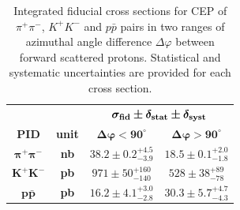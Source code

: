 {
\renewcommand{\arraystretch}{1.5}
\begin{table}[]\centering
\begin{tabular}{cc c c}
~ & ~ & \multicolumn{2}{c}{$\bm{ \sigma_{\text{\bf{fid}}} \pm \delta_{\text{\bf{stat}}} \pm \delta_{\text{\bf{syst}}}}$} \\
 \bf{PID} & \bf{unit} & $\bm{\Delta\varphi<90^{\circ}}$ & $\bm{\Delta\varphi>90^{\circ}}$ \\ \hline\hline
 $\bm{\pi^{+}\pi^{-}}$ & \bf{nb} & $38.2\pm0.2^{+4.5}_{-3.9}$ & $18.5\pm0.1^{+2.0}_{-1.8}$ \\ %
 $\bm{K^{+}K^{-}}$ & \bf{pb} & $971\pm50^{+160}_{-140}$ & $528\pm38^{+89}_{-78}$ \\ %
 $\bm{p\bar{p}}$ & \bf{pb} & $16.2\pm4.1^{+3.0}_{-2.8}$ & $30.3\pm5.7^{+4.7}_{-4.3}$\\ %
\end{tabular}
\caption{Integrated fiducial cross sections for CEP of $\pi^{+}\pi^{-}$, $K^{+}K^{-}$ and $p\bar{p}$ pairs in two ranges of azimuthal angle difference $\Delta\varphi$ between forward scattered protons. Statistical and systematic uncertainties are provided for each cross section.}\label{tab:xSec}
\end{table}
}



